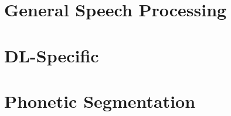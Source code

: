 \documentclass[a4paper]{article}
\begin{document}
\newpage
\section{General Speech Processing}
\subsection{}

\subsection{}

\subsection{}


\newpage
\section{DL-Specific}
\subsection{}

\subsection{}

\subsection{}

\subsection{}


\newpage
\section{Phonetic Segmentation}
\end{document}
